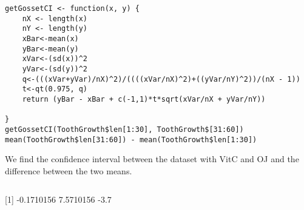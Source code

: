 \documentclass[11pt]{article} %
\begin{document}
\begin{lstlisting}
getGossetCI <- function(x, y) {
	nX <- length(x)
	nY <- length(y)
	xBar<-mean(x)
	yBar<-mean(y)
	xVar<-(sd(x))^2
	yVar<-(sd(y))^2
	q<-(((xVar+yVar)/nX)^2)/((((xVar/nX)^2)+((yVar/nY)^2))/(nX - 1))
	t<-qt(0.975, q)
	return (yBar - xBar + c(-1,1)*t*sqrt(xVar/nX + yVar/nY))

}
getGossetCI(ToothGrowth$len[1:30], ToothGrowth$[31:60])
mean(ToothGrowth$len[31:60]) - mean(ToothGrowth$len[1:30])
\end{lstlisting}
We find the confidence interval between the dataset with VitC and OJ and the difference between the two means.
\begin{lstlisting}
\end{lstlisting}
[1] -0.1710156  7.5710156
-3.7
\end{document}
